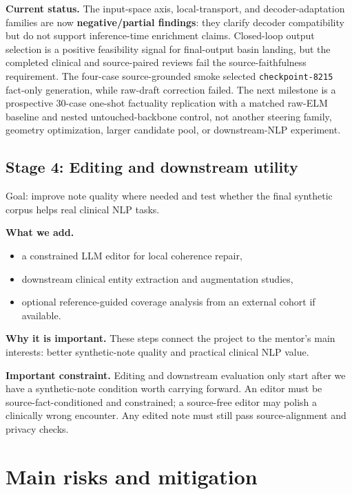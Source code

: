 \documentclass[11pt]{article}
\begin{document}
\textbf{Current status.}
The input-space axis, local-transport, and decoder-adaptation families are now \textbf{negative/partial findings}: they clarify decoder compatibility but do not support inference-time enrichment claims. Closed-loop output selection is a positive feasibility signal for final-output basin landing, but the completed clinical and source-paired reviews fail the source-faithfulness requirement. The four-case source-grounded smoke selected \texttt{checkpoint-8215} fact-only generation, while raw-draft correction failed. The next milestone is a prospective 30-case one-shot factuality replication with a matched raw-ELM baseline and nested untouched-backbone control, not another steering family, geometry optimization, larger candidate pool, or downstream-NLP experiment.

\subsection{Stage 4: Editing and downstream utility}

Goal: improve note quality where needed and test whether the final synthetic corpus helps real clinical NLP tasks.

\textbf{What we add.}
\begin{itemize}[nosep]
  \item a constrained LLM editor for local coherence repair,
  \item downstream clinical entity extraction and augmentation studies,
  \item optional reference-guided coverage analysis from an external cohort if available.
\end{itemize}

\textbf{Why it is important.}
These steps connect the project to the mentor's main interests: better synthetic-note quality and practical clinical NLP value.

\textbf{Important constraint.}
Editing and downstream evaluation only start after we have a synthetic-note condition worth carrying forward. An editor must be source-fact-conditioned and constrained; a source-free editor may polish a clinically wrong encounter. Any edited note must still pass source-alignment and privacy checks.

\section{Main risks and mitigation}
\end{document}
